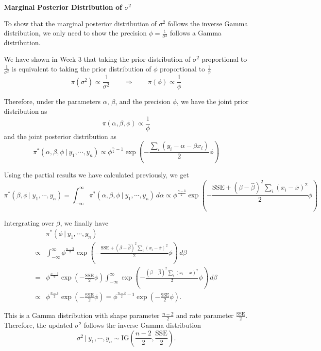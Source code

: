 \documentclass[]{book}
\theoremstyle{definition}
\theoremstyle{definition}
\theoremstyle{definition}
\theoremstyle{remark}
\begin{document}
\textbf{Marginal Posterior Distribution of \(\sigma^2\)}

To show that the marginal posterior distribution of \(\sigma^2\) follows
the inverse Gamma distribution, we only need to show the precision
\(\displaystyle \phi = \frac{1}{\sigma^2}\) follows a Gamma
distribution.

We have shown in Week 3 that taking the prior distribution of
\(\sigma^2\) proportional to \(\displaystyle \frac{1}{\sigma^2}\) is
equivalent to taking the prior distribution of \(\phi\) proportional to
\(\displaystyle \frac{1}{\phi}\)
\[ \pi(\sigma^2) \propto \frac{1}{\sigma^2}\qquad \Longrightarrow \qquad \pi(\phi)\propto \frac{1}{\phi} \]

Therefore, under the parameters \(\alpha\), \(\beta\), and the precision
\(\phi\), we have the joint prior distribution as
\[ \pi(\alpha, \beta, \phi) \propto \frac{1}{\phi} \] and the joint
posterior distribution as \[ 
\pi^*(\alpha, \beta, \phi~|~y_1,\cdots,y_n) \propto \phi^{\frac{n}{2}-1}\exp\left(-\frac{\sum_i(y_i-\alpha-\beta x_i)}{2}\phi\right) 
\]

Using the partial results we have calculated previously, we get \[
\pi^*(\beta, \phi~|~y_1,\cdots,y_n) = \int_{-\infty}^\infty \pi^*(\alpha, \beta, \phi~|~y_1,\cdots,y_n)\, d\alpha \propto \phi^{\frac{n-3}{2}}\exp\left(-\frac{\text{SSE}+(\beta-\hat{\beta})^2\sum_i (x_i-\bar{x})^2}{2}\phi\right) 
\]

Intergrating over \(\beta\), we finally have \[
\begin{aligned}
& \pi^*(\phi~|~y_1,\cdots,y_n) \\
\propto & \int_{-\infty}^\infty \phi^{\frac{n-3}{2}}\exp\left(-\frac{\text{SSE}+(\beta-\hat{\beta})^2\sum_i (x_i-\bar{x})^2}{2}\phi\right)\, d\beta\\
= & \phi^{\frac{n-3}{2}}\exp\left(-\frac{\text{SSE}}{2}\phi\right)\int_{-\infty}^\infty \exp\left(-\frac{(\beta-\hat{\beta})^2\sum_i(x_i-\bar{x})^2}{2}\phi\right)\, d\beta\\
\propto & \phi^{\frac{n-4}{2}}\exp\left(-\frac{\text{SSE}}{2}\phi\right) = \phi^{\frac{n-2}{2}-1}\exp\left(-\frac{\text{SSE}}{2}\phi\right).
\end{aligned}
\]

This is a Gamma distribution with shape parameter
\(\displaystyle \frac{n-2}{2}\) and rate parameter
\(\displaystyle \frac{\text{SSE}}{2}\). Therefore, the updated
\(\sigma^2\) follows the inverse Gamma distribution
\[ \sigma^2~|~y_1,\cdots,y_n \sim \text{IG}\left(\frac{n-2}{2}, \frac{\text{SSE}}{2}\right). \]
\end{document}
